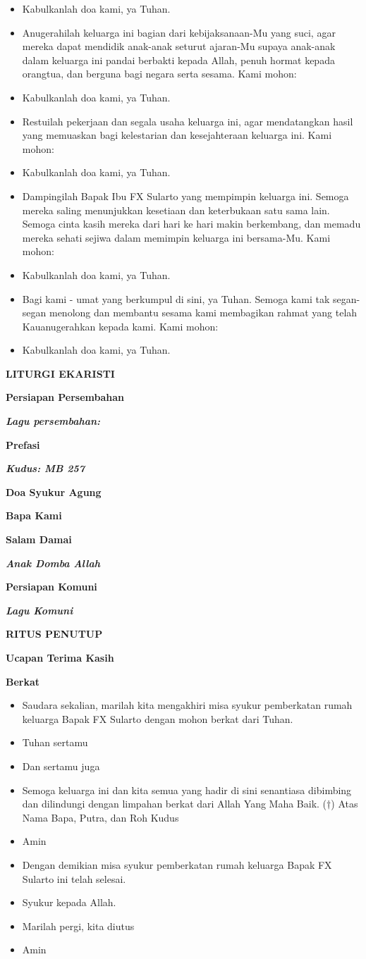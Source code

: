 \documentclass[12pt]{book}
\makeatletter
\newcommand{\judul}[1]{%
  {\parindent \z@ \centering \normalfont
    \interlinepenalty\@M \Large \bfseries #1\par\nobreak \vskip 20\p@ }}
\newcommand{\subjudul}[1]{%
  {\parindent \z@ \normalfont
    \interlinepenalty\@M \bfseries #1\par\nobreak \vskip 20\p@ }}
\newcommand{\lagu}[1]{%
  {\parindent \z@ \normalfont
    \interlinepenalty\@M \bfseries \emph{#1}\par\nobreak \vskip 20\p@ }}
\newcommand{\BU}[1]{\begin{itemize} \item[U:] #1 \end{itemize}}
\newcommand{\BI}[1]{\begin{itemize} \item[I:] #1 \end{itemize}}
\newcommand{\BP}[1]{\begin{itemize} \item[P:] #1 \end{itemize}}
\newcommand{\keluarga}{FX Sularto }
\makeatother
\begin{document}
\BU{Kabulkanlah doa kami, ya Tuhan.}

\BP{Anugerahilah keluarga ini bagian dari kebijaksanaan-Mu yang suci, agar mereka dapat mendidik anak-anak seturut ajaran-Mu supaya anak-anak dalam keluarga ini pandai berbakti kepada Allah, penuh hormat kepada orangtua, dan berguna bagi negara serta sesama. Kami mohon:}

\BU{Kabulkanlah doa kami, ya Tuhan.}

\BP{Restuilah pekerjaan dan segala usaha keluarga ini, agar mendatangkan hasil yang memuaskan bagi kelestarian dan kesejahteraan keluarga ini. Kami mohon:}

\BU{Kabulkanlah doa kami, ya Tuhan.}

\BP{Dampingilah Bapak Ibu \keluarga yang mempimpin keluarga ini. Semoga mereka saling menunjukkan kesetiaan dan keterbukaan satu sama lain. Semoga cinta kasih mereka dari hari ke hari makin berkembang, dan memadu mereka sehati sejiwa dalam memimpin keluarga ini bersama-Mu. Kami mohon:}

\BU{Kabulkanlah doa kami, ya Tuhan.}

\BP{Bagi kami - umat yang berkumpul di sini, ya Tuhan. Semoga kami tak segan-segan menolong dan membantu sesama kami membagikan rahmat yang telah Kauanugerahkan kepada kami. Kami mohon:}

\BU{Kabulkanlah doa kami, ya Tuhan.}

\judul{LITURGI EKARISTI}

\subjudul{Persiapan Persembahan}

\lagu{Lagu persembahan: }

\subjudul{Prefasi}

\lagu{Kudus: MB 257}

\subjudul{Doa Syukur Agung}

\subjudul{Bapa Kami}

\subjudul{Salam Damai}

\lagu{Anak Domba Allah}

\subjudul{Persiapan Komuni}

\lagu{Lagu Komuni}

\judul{RITUS PENUTUP}

\subjudul{Ucapan Terima Kasih}

\subjudul{Berkat}

\BI{Saudara sekalian, marilah kita mengakhiri misa syukur pemberkatan rumah keluarga Bapak \keluarga dengan mohon berkat dari Tuhan.}
\BI{Tuhan sertamu}
\BU{Dan sertamu juga}
\BI{Semoga keluarga ini dan kita semua yang hadir di sini senantiasa dibimbing dan dilindungi dengan limpahan berkat dari Allah Yang Maha Baik. ($\dagger$) Atas Nama Bapa, Putra, dan Roh Kudus}
\BU{Amin}
\BI{Dengan demikian misa syukur pemberkatan rumah keluarga Bapak \keluarga ini telah selesai.}
\BU{Syukur kepada Allah.}
\BI{Marilah pergi, kita diutus}
\BU{Amin}
\end{document}
